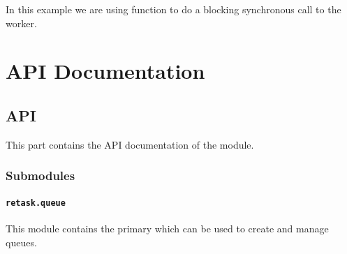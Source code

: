 \documentclass[letterpaper,10pt,english]{sphinxmanual}
\begin{document}
In this example we are using {\hyperref[retask.queue:retask.queue.Job.wait]{}} function to do a blocking
synchronous call to the worker.


\chapter{API Documentation}
\label{index:api-documentation}

\section{API}
\label{api:api}\label{api::doc}\label{api:id1}\label{api:module-retask}
This part contains the API documentation of the module.


\subsection{Submodules}
\label{api:submodules}

\subsubsection{\texttt{retask.queue}}
\label{retask.queue::doc}\label{retask.queue:retask-queue}
This module contains the primary  which
can be used to create and manage queues.
\end{document}
